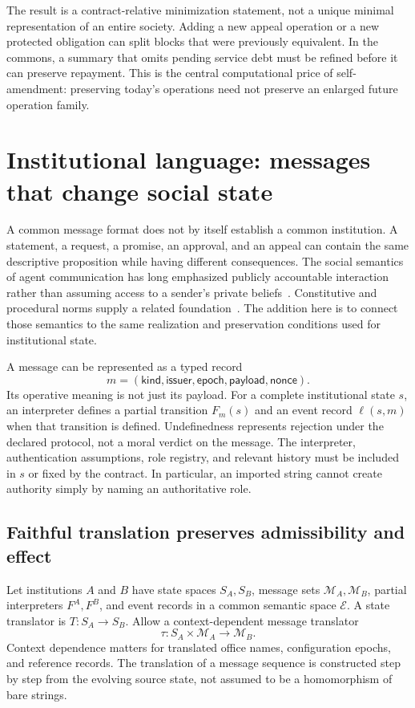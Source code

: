 \documentclass[11pt,letterpaper]{article}
\theoremstyle{plain}
\theoremstyle{definition}
\theoremstyle{remark}
\begin{document}
The result is a contract-relative minimization statement, not a unique minimal representation of an entire society. Adding a new appeal operation or a new protected obligation can split blocks that were previously equivalent. In the commons, a summary that omits pending service debt must be refined before it can preserve repayment. This is the central computational price of self-amendment: preserving today's operations need not preserve an enlarged future operation family.

\section{Institutional language: messages that change social state}\label{sec:language}
A common message format does not by itself establish a common institution. A statement, a request, a promise, an approval, and an appeal can contain the same descriptive proposition while having different consequences. The social semantics of agent communication has long emphasized publicly accountable interaction rather than assuming access to a sender's private beliefs~\cite{singhacl}. Constitutive and procedural norms supply a related foundation~\cite{boella,grossinorm}. The addition here is to connect those semantics to the same realization and preservation conditions used for institutional state.

A message can be represented as a typed record
\[
m=(\mathsf{kind},\mathsf{issuer},\mathsf{epoch},\mathsf{payload},\mathsf{nonce}).
\]
Its operative meaning is not just its payload. For a complete institutional state $s$, an interpreter defines a partial transition $F_m(s)$ and an event record $\ell(s,m)$ when that transition is defined. Undefinedness represents rejection under the declared protocol, not a moral verdict on the message. The interpreter, authentication assumptions, role registry, and relevant history must be included in $s$ or fixed by the contract. In particular, an imported string cannot create authority simply by naming an authoritative role.

\subsection{Faithful translation preserves admissibility and effect}
Let institutions $A$ and $B$ have state spaces $S_A,S_B$, message sets $\mathcal M_A,\mathcal M_B$, partial interpreters $F^A,F^B$, and event records in a common semantic space $\mathcal E$. A state translator is $T:S_A\to S_B$. Allow a context-dependent message translator
\[
\tau:S_A\times\mathcal M_A\to\mathcal M_B.
\]
Context dependence matters for translated office names, configuration epochs, and reference records. The translation of a message sequence is constructed step by step from the evolving source state, not assumed to be a homomorphism of bare strings.
\end{document}
